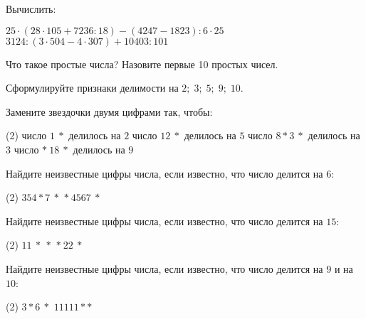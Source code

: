 %
%

\begin{class}[number=1]
	\begin{listofex}
	\item Вычислить:
	\begin{tasks}
		\task \( 25\cdot(28\cdot105+7236:18)-(4247-1823):6\cdot25 \)
		\task \( 3124:(3\cdot504-4\cdot307)+10403:101 \)
	\end{tasks}
	\item Что такое простые числа? Назовите первые 10 простых чисел.
	\item Сформулируйте признаки делимости на \( 2;\;3;\;5;\;9;\;10 \).
	\item Замените звездочки двумя цифрами так, чтобы:
	\begin{tasks}(2)
		\task число \( 1\:* \) делилось на \( 2 \)
		\task число \( 12\:* \) делилось на \( 5 \)
		\task число \( 8*3\:* \) делилось на \( 3 \)
		\task число \( *\:18\:* \) делилось на \( 9 \)
	\end{tasks}
	\item Найдите неизвестные цифры числа, если известно, что число делится на \( 6 \):
	\begin{tasks}(2)
		\task \( 354*7\:* \)
		\task \( *\:4567\:* \)
	\end{tasks}
	\item Найдите неизвестные цифры числа, если известно, что число делится на \( 15 \):
	\begin{tasks}(2)
		\task \( 11\:*\:* \)
		\task \( *\:22\:* \)
	\end{tasks}
	\item Найдите неизвестные цифры числа, если известно, что число делится на \( 9 \) и на \( 10 \):
	\begin{tasks}(2)
		\task \( 3*6\:* \)
		\task \( 11111** \)
	\end{tasks}
	\end{listofex}
\end{class}

